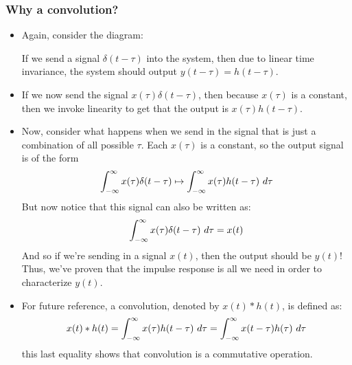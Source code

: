 \subsubsection{Why a convolution?}
\begin{itemize}
	\item Again, consider the diagram:
	\begin{center}
		\end{center}
		If we send a signal \( \delta(t - \tau) \) into the system, then due to linear time invariance, the 
		system should output \( y(t - \tau) = h(t - \tau) \). 
	\item If we now send the signal \( x(\tau) \delta(t - \tau) \), then because \( x(\tau) \) is a constant, 
		then we invoke linearity to get that the output is  \( x(\tau) h(t - \tau) \). 
	\item Now, consider what happens when we send in the signal that is just a combination of all possible \( \tau \). 
		Each \( x(\tau) \) is a constant, so the output signal is of the form
		\[
		\int_{-\infty}^{\infty} x(\tau) \delta(t - \tau) \mapsto \int_{-\infty}^{\infty} x(\tau) h(t - \tau) 
		\ d \tau
		\] 
		But now notice that this signal can also be written as:
		\[
		\int_{-\infty}^{\infty} x(\tau) \delta(t - \tau) \ d \tau = x(t)
		\] 
		And so if we're sending in a signal \( x(t) \), then the output should be \( y(t) \)! Thus, we've proven that
		the impulse response is all we need in order to characterize \( y(t) \).
	\item For future reference, a convolution, denoted by \( x(t) * h(t) \), is defined as: 
		\[
		x(t) * h(t) = \int_{-\infty}^{\infty} x(\tau) h(t - \tau) \ d  \tau = \int_{-\infty}^{\infty} x(t - \tau)
		h(\tau) \ d \tau
		\] 
		this last equality shows that convolution is a commutative operation. 
\end{itemize}
